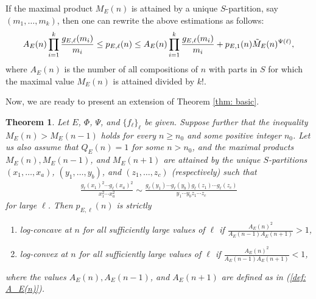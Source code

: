 \documentclass[12pt]{amsart}
\newtheorem{theorem}{Theorem}
\theoremstyle{definition}
\theoremstyle{remark}
\numberwithin{theorem}{section} \numberwithin{equation}{section}
\begin{document}
If the maximal product $M_E(n)$ is
attained by a unique $S$-partition, say $(m_1,\ldots,m_k)$, then one can
rewrite the above estimations as follows: 
\begin{align}\label{def: A_E(n)}
A_E(n)\prod_{i=1}^k\frac{g_{E,\ell }(m_i)}{m_i}\leq p_{E,\ell }(n) \leq A_E(n)\prod_{i=1}^k\frac{g_{E,\ell }(m_i)}{m_i}+p_{E,1}(n)\Tilde{M}_E(n)^{\Psi(\ell)},
\end{align}
where $A_E(n)$ is the number of all compositions of $n$ with parts in $S$ for
which the maximal value $M_E(n)$ is attained divided by $k!$.

Now, we are ready to present an extension of Theorem \ref{thm: basic}.
\begin{theorem}\label{thm: involved}
Let $E$, $\Phi$, $\Psi$, and
$\{f_{\ell}\}_{\ell}$ be given. Suppose further that the inequality
$M_E(n)>M_E(n-1)$ holds for every $n\geq n_0$ and some positive integer
$n_0$. Let us also assume that $Q_{E}\left( n\right) =1$ for some
$n>n_0$, and  the maximal products $M_E(n), M_E(n-1)$,
and $M_E(n+1)$ are attained by the unique $S$-partitions $(x_1,\ldots,x_a)$,
$(y_1,\ldots,y_b)$, and $(z_1,\ldots,z_c)$ (respectively) such that
\begin{align*}
\frac{g_{\ell}(x_1)^2\cdots g_{\ell}(x_a)^2}{x_1^2\cdots x_a^2}\sim
\frac{g_{\ell}(y_1)\cdots g_{\ell}(y_b)g_{\ell}(z_1)\cdots g_{\ell}(z_c)}{y_1\cdots y_bz_1\cdots z_c}
\end{align*}
for large $\ell $.
Then $p_{E,\ell }(n)$ is strictly
\begin{enumerate}
\item  log-concave at $n$ for all sufficiently large values of $\ell$ if $\frac{A_E(n)^2}{A_E(n-1)A_E(n+1)}>1$,
\item  log-convex at $n$ for all sufficiently large values of $\ell$ if $\frac{A_E(n)^2}{A_E(n-1)A_E(n+1)}<1$,
\end{enumerate}
where the values $A_E(n), A_E(n-1)$, and $A_E(n+1)$ are defined as in  (\ref{def: A_E(n)}).
\end{theorem}
\end{document}
